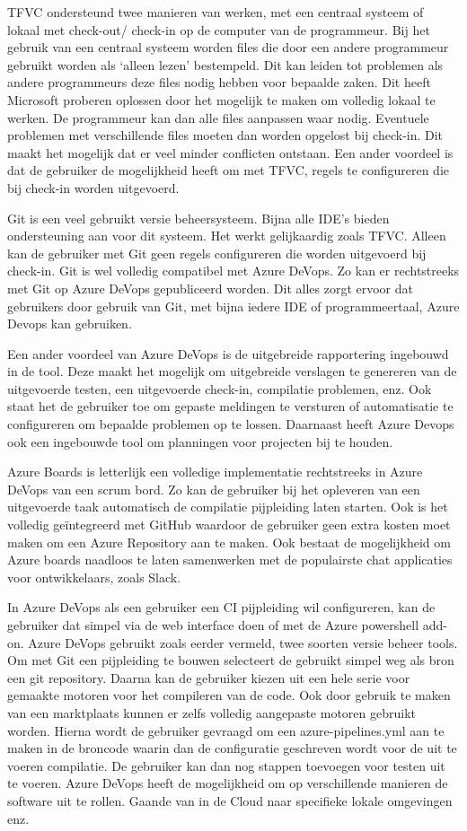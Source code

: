 TFVC ondersteund twee manieren van werken, met een centraal systeem of lokaal met check-out/ check-in op de computer van de programmeur. Bij het gebruik van een centraal systeem worden files die door een andere programmeur gebruikt worden als ‘alleen lezen’ bestempeld. Dit kan leiden tot problemen als andere programmeurs deze files nodig hebben voor bepaalde zaken. Dit heeft Microsoft proberen oplossen door het mogelijk te maken om volledig lokaal te werken. De programmeur kan dan alle files aanpassen waar nodig. Eventuele problemen met verschillende files moeten dan worden opgelost bij check-in. Dit maakt het mogelijk dat er veel minder conflicten ontstaan. Een ander voordeel is dat de gebruiker de mogelijkheid heeft om met TFVC, regels te configureren die bij check-in worden uitgevoerd.

Git is een veel gebruikt versie beheersysteem. Bijna alle IDE’s bieden ondersteuning aan voor dit systeem. Het werkt gelijkaardig zoals TFVC. Alleen kan de gebruiker met Git geen regels configureren die worden uitgevoerd bij check-in. Git is wel volledig compatibel met Azure DeVops. Zo kan er rechtstreeks met Git op Azure DeVops gepubliceerd worden. Dit alles zorgt ervoor dat gebruikers door gebruik van Git, met bijna iedere IDE of programmeertaal, Azure Devops kan gebruiken. 

Een ander voordeel van Azure DeVops is de uitgebreide rapportering ingebouwd in de tool. Deze maakt het mogelijk om uitgebreide verslagen te genereren van de uitgevoerde testen, een uitgevoerde check-in, compilatie problemen, enz. Ook staat het de gebruiker toe om gepaste meldingen te versturen of automatisatie te configureren om bepaalde problemen op te lossen. Daarnaast heeft Azure Devops ook een ingebouwde tool om planningen voor projecten bij te houden.

Azure Boards is letterlijk een volledige implementatie rechtstreeks in Azure DeVops van een scrum bord. Zo kan de gebruiker bij het opleveren van een uitgevoerde taak automatisch de compilatie pijpleiding laten starten. Ook is het volledig geïntegreerd met GitHub waardoor de gebruiker geen extra kosten moet maken om een Azure Repository aan te maken. Ook bestaat de mogelijkheid om Azure boards naadloos te laten samenwerken met de populairste chat applicaties voor ontwikkelaars, zoals Slack.

In Azure DeVops als een gebruiker een CI pijpleiding wil configureren, kan de gebruiker dat simpel via de web interface doen of met de Azure powershell add-on. Azure DeVops gebruikt zoals eerder vermeld, twee soorten versie beheer tools. Om met Git een pijpleiding te bouwen selecteert de gebruikt simpel weg als bron een git repository. Daarna kan de gebruiker kiezen uit een hele serie voor gemaakte motoren voor het compileren van de code. Ook door gebruik te maken van een marktplaats kunnen er zelfs volledig aangepaste motoren gebruikt worden. Hierna wordt de gebruiker gevraagd om een azure-pipelines.yml aan te maken in de broncode waarin dan de configuratie geschreven wordt voor de uit te voeren compilatie. De gebruiker kan dan nog stappen toevoegen voor testen uit te voeren. Azure DeVops heeft de mogelijkheid om op verschillende manieren de software uit te rollen. Gaande van in de Cloud naar specifieke lokale omgevingen enz.


